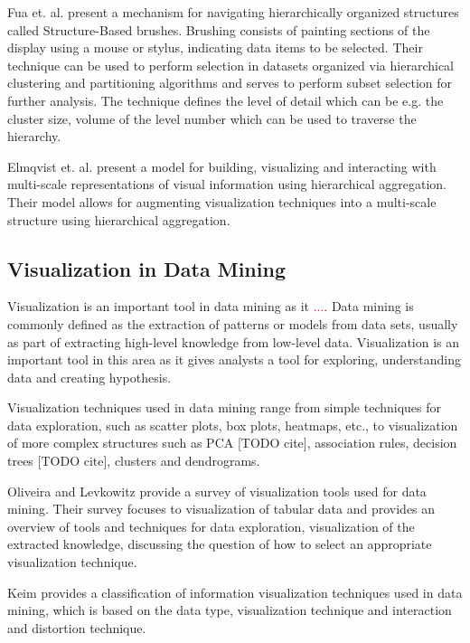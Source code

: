 Fua et. al. \cite{Fua:2000:SBM:614278.614457} present a mechanism for navigating hierarchically organized structures
called Structure-Based brushes. Brushing consists of painting sections of the display using a mouse or stylus, indicating
data items to be selected. Their technique can be used to perform selection in datasets organized via hierarchical
clustering and partitioning algorithms and serves to perform subset selection for further analysis. The technique defines
the level of detail which can be e.g. the cluster size, volume of the level number which can be used to traverse the
hierarchy.

Elmqvist et. al. \cite{Elmqvist:2010:HAI:1749404.1749525} present a model for building, visualizing and interacting with
multi-scale representations of visual information using hierarchical aggregation. Their model allows for augmenting visualization
techniques into a multi-scale structure using hierarchical aggregation.

\subsection{Visualization in Data Mining}

Visualization is an important tool in data mining as it \textcolor{red}{...}. Data mining is commonly defined
as the extraction of patterns or models from data sets, usually as part of extracting high-level
knowledge from low-level data. Visualization is an important tool in this area as it gives analysts a
tool for exploring, understanding data and creating hypothesis.

Visualization techniques used in data mining range from simple techniques for data exploration, such as
scatter plots, box plots, heatmaps, etc., to visualization of more complex structures such as PCA [TODO cite],
association rules, decision trees [TODO cite], clusters and dendrograms.

Oliveira and Levkowitz \cite{1207445} provide a survey of visualization tools used for data mining. Their survey focuses
to visualization of tabular data and provides an overview of tools and techniques for data exploration,
visualization of the extracted knowledge, discussing the question of how to select an appropriate visualization
technique.

Keim \cite{981847} provides a classification of information visualization techniques used in data mining, which is based on
the data type, visualization technique and interaction and distortion technique.

